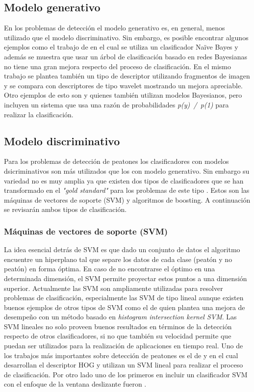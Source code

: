 \subsection{Modelo generativo}

En los problemas de detección el modelo generativo es, en general, menos utilizado que el modelo discriminativo. Sin embargo, es posible encontrar algunos ejemplos como el trabajo de \cite{Vidal-Naquet2003} en el cual se utiliza un clasificador Naïve Bayes y además se muestra que usar un árbol de clasificación basado en redes Bayesianas no tiene una gran mejora respecto del proceso de clasificación. En el mismo trabajo se plantea también un tipo de descriptor utilizando fragmentos de imagen y se compara con descriptores de tipo wavelet mostrando un mejora apreciable. Otro ejemplos de esto son \cite{Weber2000} y \cite{Fergus2003} quienes también utilizan modelos Bayesianos, pero incluyen un sistema que usa una razón de probabilidades \textit{p(y)~/~p(1)} para realizar la clasificación.

\subsection{Modelo discriminativo}

Para los problemas de detección de peatones los clasificadores con modelos dsicriminativos son más utilizados que los con modelo generativo. Sin embargo su variedad no es muy amplia ya que existen dos tipos de clasificadores que se han transformado en el \textit{"gold standard"} para los problemas de este tipo \cite{dollar2012}. Estos son las máquinas de vectores de soporte (SVM) y algoritmos de boosting. A continuación se revisarán ambos tipos de clasificación.

\subsubsection{Máquinas de vectores de soporte (SVM)}

La idea esencial detrás de SVM es que dado un conjunto de datos el algoritmo encuentre un hiperplano tal que separe los datos de cada clase (peatón y no peatón) en forma óptima. En caso de no encontrarse el óptimo en una determinada dimensión, el SVM permite proyectar estos puntos a una dimensión superior. Actualmente las SVM son ampliamente utilizadas para resolver problemas de clasificación, especialmente las SVM de tipo lineal aunque existen buenos ejemplos de otros tipos de SVM como el de \cite{Maji2008} quien plantea una mejora de desempeño con un método basado en \textit{histogram intersection kernel SVM}.
Las SVM lineales no solo proveen buenos resultados en términos de la detección respecto de otros clasificadores, si no que también su velocidad permite que puedan ser utilizados para la realización de aplicaciones en tiempo real. Uno de los trabajos más importantes sobre detección de peatones es el de \cite{dalal2005} y \cite{dalal2006} en el cual desarrollan el descriptor HOG y utilizan un SVM lineal para realizar el proceso de clasificación. Por otro lado uno de los primeros en incluir un clasificador SVM con el enfoque de la ventana deslizante fueron \cite{Papageorgiou2000}. 

